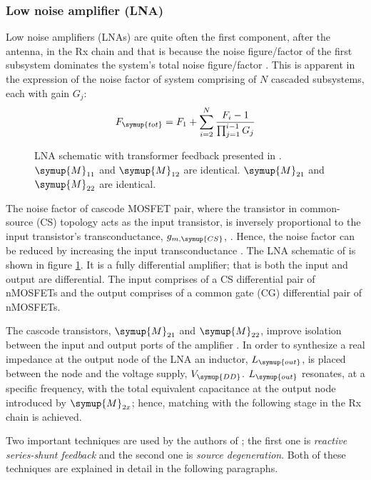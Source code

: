 	\subsubsection{Low noise amplifier (LNA)}

		Low noise amplifiers (LNAs) are quite often the first component, after the antenna, in the Rx chain and that is because the noise figure/factor of the first subsystem dominates the system's total noise figure/factor \cite{frenzel2015principles}. This is apparent in the expression of the noise factor of system comprising of $N$ cascaded subsystems, each with gain $G_j$:
		\begin{equation}
			\label{eq:cascode_noise_factor}
			F_{\symup{tot}}=F_1+\sum_{i=2}^{N}{\frac{F_i-1}{\prod_{j=1}^{i-1}{G_j}}}
		\end{equation}

		\begin{figure}[ht!]
			\centering
			
			\caption{LNA schematic with transformer feedback presented in \cite{FDSOI2}. $\symup{M}_{11}$ and $\symup{M}_{12}$ are identical. $\symup{M}_{21}$ and $\symup{M}_{22}$ are identical.}
			\label{fig:FDSOI:TRX:LNA}
		\end{figure}

		The noise factor of cascode MOSFET pair, where the transistor in common-source (CS) topology acts as the input transistor, is inversely proportional to the input transistor's transconductance, $g_{m,\symup{CS}}$, \cite{Adaptive2008}. Hence, the noise factor can be reduced by increasing the input transconductance \cite{FDSOI2} \cite{Adaptive2008}. The LNA schematic of \cite{FDSOI2} is shown in figure \ref{fig:FDSOI:TRX:LNA}. It is a fully differential amplifier; that is both the input and output are differential. The input comprises of a CS differential pair of nMOSFETs and the output comprises of a common gate (CG) differential pair of nMOSFETs.\par

		The cascode transistors, $\symup{M}_{21}$ and $\symup{M}_{22}$, improve isolation between the input and output ports of the amplifier \cite{RFICRogers}. In order to synthesize a real impedance at the output node of the LNA an inductor, $L_{\symup{out}}$, is placed between the node and the voltage supply, $V_{\symup{DD}}$. $L_{\symup{out}}$ resonates, at a specific frequency, with the total equivalent capacitance at the output node introduced by $\symup{M}_{2x}$; hence, matching with the following stage  in the Rx chain is achieved.\par
		Two important techniques are used by the authors of \cite{FDSOI2}; the first one is \textsl{reactive series-shunt feedback} and the second one is \textsl{source degeneration}. Both of these techniques are explained in detail in the following paragraphs.\par

